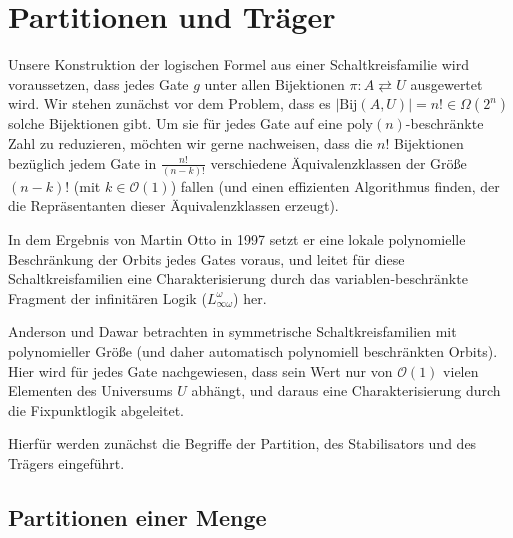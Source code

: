 
\chapter{Partitionen und Träger}

Unsere Konstruktion der logischen Formel aus einer Schaltkreisfamilie
wird voraussetzen, dass jedes Gate $g$ unter allen Bijektionen $\pi:A\rightleftarrows U$
ausgewertet wird. Wir stehen zunächst vor dem Problem, dass es $\left|\mathrm{Bij}\left(A,U\right)\right|=n!\in\Omega\left(2^{n}\right)$
solche Bijektionen gibt. Um sie für jedes Gate auf eine $\mathrm{poly}\left(n\right)$-beschränkte
Zahl zu reduzieren, möchten wir gerne nachweisen, dass die $n!$ Bijektionen
bezüglich jedem Gate in $\frac{n!}{\left(n-k\right)!}$ verschiedene
Äquivalenzklassen der Größe $\left(n-k\right)!$ (mit $k\in\mathcal{O}\left(1\right)$)
fallen (und einen effizienten Algorithmus finden, der die Repräsentanten
dieser Äquivalenzklassen erzeugt).

In dem Ergebnis von Martin Otto in 1997\cite{Otto1997} setzt er eine
lokale polynomielle Beschränkung der Orbits jedes Gates voraus, und
leitet für diese Schaltkreisfamilien eine Charakterisierung durch
das variablen-beschränkte Fragment der infinitären Logik ($L_{\infty\omega}^{\omega}$)
her.

Anderson und Dawar betrachten in \cite{AD2014} symmetrische Schaltkreisfamilien
mit polynomieller Größe (und daher automatisch polynomiell beschränkten
Orbits). Hier wird für jedes Gate nachgewiesen, dass sein Wert nur
von $\mathcal{O}\left(1\right)$ vielen Elementen des Universums $U$
abhängt, und daraus eine Charakterisierung durch die Fixpunktlogik
abgeleitet.

Hierfür werden zunächst die Begriffe der Partition, des Stabilisators
und des Trägers eingeführt.

\section{Partitionen einer Menge}

